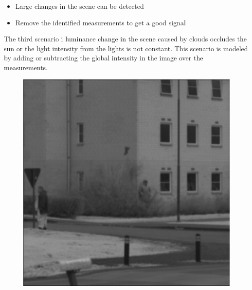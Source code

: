 \begin{itemize}
    \item Large changes in the scene can be detected
    \item Remove the identified measurements to get a good signal 
\end{itemize}


The third scenario i luminance change in the scene caused by clouds occludes the sun or the light intensity from the lights is not constant. This scenario is modeled by adding or subtracting the global intensity in the image over the measurements. 

\begin{figure}[H]
    \centering
\begin{minipage}[t]{0.245\textwidth}
    \includegraphics[width=1\textwidth]{result/dynamic/lum/intense_change_org.png}
    \label{fig:lum_1}
\end{minipage}
\begin{minipage}[t]{0.245\textwidth}

\end{minipage}
\end{figure}
